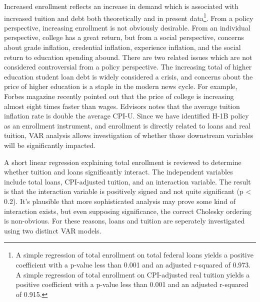 \documentclass[review]{elsarticle}
\begin{document}
    Increased enrollment reflects an increase in demand which is associated with
    increased tuition and debt both theoretically and in present data\footnote{
        A simple regression of total enrollment on total federal loans yields a
        positive coefficient with a p-value less than 0.001 and an adjusted r-squared
        of 0.973.
        A simple regression of total enrollment on CPI-adjusted real tuition yields a
        positive coefficient with a p-value less than 0.001 and an adjusted r-squared
        of 0.915.
    }.
    From a policy perspective, increasing enrollment is not obviously desirable.
    From an individual perspective, college has a great return,
    but from a social perspective,
    concerns about grade inflation,
    credential inflation,
    experience inflation,
    and the social return to education spending abound.
    There are two related issues which are not considered controversial from a policy perspective.
    The increasing total of higher education student loan debt is widely considered a crisis,
    and concerns about the price of higher education is a staple in the modern news cycle.
    For example, Forbes magazine recently pointed out that the price of college is increasing almost eight times faster than wages\cite{maldonado2018price}.
    Edvisors notes that the average tuition inflation rate is double the average CPI-U\cite{edvisors_2019}.
    Since we have identified H-1B policy as an enrollment instrument,
    and enrollment is directly related to loans and real tuition,
    VAR analysis allows investigation of whether those downstream variables will be significantly impacted.

    A short linear regression explaining total enrollment
    is reviewed to determine whether tuition and loans significantly interact.
    The independent variables include total loans,
    CPI-adjusted tuition,
    and an interaction variable.
    The result is that the interaction variable is positively signed and not quite significant (p < 0.2).
    It's plausible that more sophisticated analysis may prove some kind of interaction exists,
    but even supposing significance, the correct Cholesky ordering is non-obvious.
    For these reasons, loans and tuition are seperately investigated using two distinct VAR models.
\end{document}
